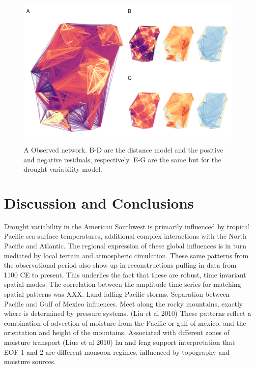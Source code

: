 \documentclass[11pt]{wlscirep}
\begin{document}


\begin{figure}[!htbp]
\centering
\includegraphics[width=.8\linewidth]{figures/residuals.png}
\caption{A Observed network. B-D are the distance model and the positive and negative residuals, respectively. E-G are the same but for the drought variability model.}
\label{fig:residuals}
\end{figure}
\section*{Discussion and Conclusions}
Drought variability in the American Southwest is primarily influenced by tropical Pacific sea surface temperatures, additional complex interactions with the North Pacific and Atlantic. The regional expression of these global influences is in turn mediated by local terrain and atmospheric circulation. These same patterns from the observational period also show up in reconstructions pulling in data from 1100 CE to present. This underlies the fact that these are robust, time invariant spatial modes. The correlation between the amplitude time series for matching spatial patterns was XXX. 
Land falling Pacific storms. Separation between Pacific and Gulf of Mexico influences. Meet along the rocky mountains, exactly where is determined by pressure systems. (Liu et al 2010)
These patterns reflect a combination of advection of moisture from the Pacific or gulf of mexico, and the orientation and height of the mountains.
Associated with different zones of moisture transport (Liue et al 2010)
hu and feng support interpretation that EOF 1 and 2 are different monsoon regimes, influenced by topography and moisture sources.
\end{document}
